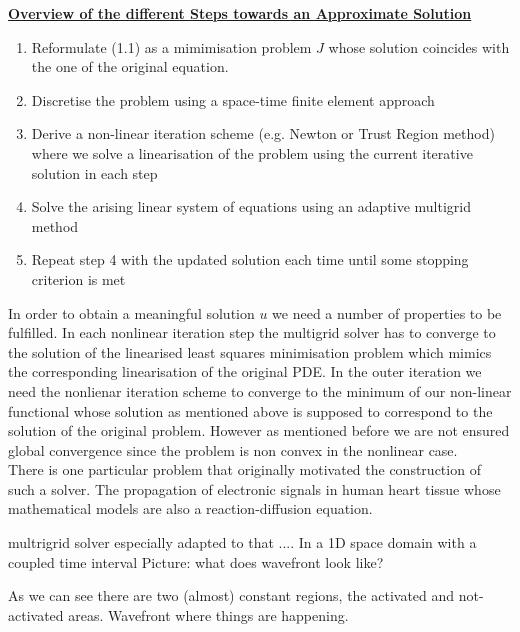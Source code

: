\documentclass[../draft_1.tex]{subfiles}
\begin{document}
\begin{framed}
	\underline{\textbf{Overview of the different Steps towards an Approximate Solution}} 
	
	\begin{enumerate}
		\item  Reformulate (1.1) as a mimimisation problem $J$ whose solution coincides with the one of the original equation. 
		\item Discretise the problem using a space-time finite element approach
		\item Derive a non-linear iteration scheme (e.g. Newton or Trust Region method) where we solve a linearisation of the problem using the current iterative solution in each step
		\item  Solve the arising linear system of equations using an adaptive multigrid method
		\item Repeat step 4 with the updated solution each time until some stopping criterion is met 
	\end{enumerate}	
\end{framed}

In order to obtain a meaningful solution $u$ we need a number of properties to be fulfilled. In each nonlinear iteration step the multigrid solver has to converge to the solution of the linearised least squares minimisation problem which mimics the corresponding linearisation of the original PDE. In the outer iteration we need the nonlienar iteration scheme to converge to the minimum of our non-linear functional whose solution as mentioned above is supposed to correspond to the solution of the original problem. However as mentioned before we are not ensured global convergence since the problem is non convex in the nonlinear case. 
\bigskip
\\
There is one particular problem that originally motivated the construction of such a solver. The propagation of electronic signals in human heart tissue whose mathematical models are also a reaction-diffusion equation. 

multrigrid solver especially adapted to that ....
In a 1D space domain with a coupled time interval 
Picture: what does wavefront look like? 

As we can see there are two (almost) constant regions, the activated and not-activated areas. 
Wavefront where things are happening. 
\end{document}
